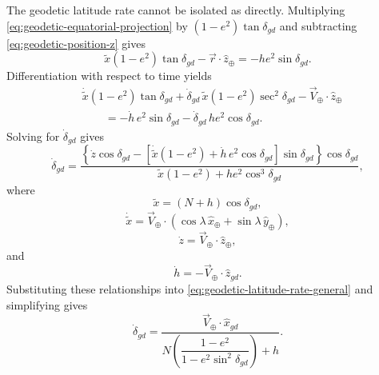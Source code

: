 
The geodetic latitude rate cannot be isolated as directly. Multiplying
\cref{eq:geodetic-equatorial-projection} by
$(1-e^2)\tan\delta_{gd}$ and subtracting
\cref{eq:geodetic-position-z} gives
\begin{equation}
  \tilde x(1-e^2)\tan\delta_{gd}
  -\vec r\mathbin{\cdot}\hat z_{\oplus}
  =-h e^2\sin\delta_{gd}.
  \label{eq:geodetic-latitude-rate-start}
\end{equation}
Differentiation with respect to time yields
\begin{equation}
  \begin{aligned}
    &\dot{\tilde x}(1-e^2)\tan\delta_{gd}
    +\dot\delta_{gd}\,\tilde x(1-e^2)\sec^2\delta_{gd}
    -\vec V_{\oplus}\mathbin{\cdot}\hat z_{\oplus}\\
    &\qquad=-\dot h\,e^2\sin\delta_{gd}
    -\dot\delta_{gd}\,h e^2\cos\delta_{gd}.
  \end{aligned}
  \label{eq:geodetic-latitude-rate-differentiated}
\end{equation}
Solving for $\dot\delta_{gd}$ gives
\begin{equation}
  \dot\delta_{gd}
  =\frac{
    \left\{
      \dot z\cos\delta_{gd}
      -\left[
        \dot{\tilde x}(1-e^2)
        +\dot h\,e^2\cos\delta_{gd}
       \right]\sin\delta_{gd}
    \right\}\cos\delta_{gd}
  }{
    \tilde x(1-e^2)+h e^2\cos^3\delta_{gd}
  },
  \label{eq:geodetic-latitude-rate-general}
\end{equation}
where
\begin{equation}
  \tilde x=(N+h)\cos\delta_{gd},
  \label{eq:equatorial-projection-for-rate}
\end{equation}
\begin{equation}
  \dot{\tilde x}
  =\vec V_{\oplus}\mathbin{\cdot}
   \left(
     \cos\lambda\,\hat x_{\oplus}
     +\sin\lambda\,\hat y_{\oplus}
   \right),
  \label{eq:equatorial-projection-rate}
\end{equation}
\begin{equation}
  \dot z=\vec V_{\oplus}\mathbin{\cdot}\hat z_{\oplus},
  \label{eq:ecfc-z-position-rate}
\end{equation}
and
\begin{equation}
  \dot h=-\vec V_{\oplus}\mathbin{\cdot}\hat z_{gd}.
  \label{eq:altitude-rate}
\end{equation}
Substituting these relationships into
\cref{eq:geodetic-latitude-rate-general} and simplifying gives
\begin{equation}
  \dot\delta_{gd}
  =\frac{\vec V_{\oplus}\mathbin{\cdot}\hat x_{gd}}
  {N\left(
       \dfrac{1-e^2}{1-e^2\sin^2\delta_{gd}}
     \right)+h}.
  \label{eq:geodetic-latitude-rate-normal-radius}
\end{equation}
